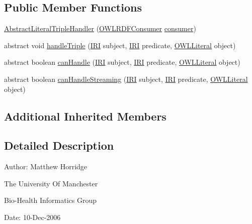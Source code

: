 \subsection*{Public Member Functions}
\begin{DoxyCompactItemize}
\item 
\hyperlink{classorg_1_1coode_1_1owlapi_1_1rdfxml_1_1parser_1_1_abstract_literal_triple_handler_a212f6f83746ed09ef51f1dbf462107b2}{Abstract\-Literal\-Triple\-Handler} (\hyperlink{classorg_1_1coode_1_1owlapi_1_1rdfxml_1_1parser_1_1_o_w_l_r_d_f_consumer}{O\-W\-L\-R\-D\-F\-Consumer} \hyperlink{classorg_1_1coode_1_1owlapi_1_1rdfxml_1_1parser_1_1_abstract_triple_handler_a4ccf4d898ff01eb1cadfa04b23d54e9c}{consumer})
\item 
abstract void \hyperlink{classorg_1_1coode_1_1owlapi_1_1rdfxml_1_1parser_1_1_abstract_literal_triple_handler_a67005240b8c67909e4a49c6ce0bad6b2}{handle\-Triple} (\hyperlink{classorg_1_1semanticweb_1_1owlapi_1_1model_1_1_i_r_i}{I\-R\-I} subject, \hyperlink{classorg_1_1semanticweb_1_1owlapi_1_1model_1_1_i_r_i}{I\-R\-I} predicate, \hyperlink{interfaceorg_1_1semanticweb_1_1owlapi_1_1model_1_1_o_w_l_literal}{O\-W\-L\-Literal} object)
\item 
abstract boolean \hyperlink{classorg_1_1coode_1_1owlapi_1_1rdfxml_1_1parser_1_1_abstract_literal_triple_handler_a86aad106f9096f130d64f23453743c2c}{can\-Handle} (\hyperlink{classorg_1_1semanticweb_1_1owlapi_1_1model_1_1_i_r_i}{I\-R\-I} subject, \hyperlink{classorg_1_1semanticweb_1_1owlapi_1_1model_1_1_i_r_i}{I\-R\-I} predicate, \hyperlink{interfaceorg_1_1semanticweb_1_1owlapi_1_1model_1_1_o_w_l_literal}{O\-W\-L\-Literal} object)
\item 
abstract boolean \hyperlink{classorg_1_1coode_1_1owlapi_1_1rdfxml_1_1parser_1_1_abstract_literal_triple_handler_ab94c7a734fbc3cf0589ddf206ab20265}{can\-Handle\-Streaming} (\hyperlink{classorg_1_1semanticweb_1_1owlapi_1_1model_1_1_i_r_i}{I\-R\-I} subject, \hyperlink{classorg_1_1semanticweb_1_1owlapi_1_1model_1_1_i_r_i}{I\-R\-I} predicate, \hyperlink{interfaceorg_1_1semanticweb_1_1owlapi_1_1model_1_1_o_w_l_literal}{O\-W\-L\-Literal} object)
\end{DoxyCompactItemize}
\subsection*{Additional Inherited Members}


\subsection{Detailed Description}
Author\-: Matthew Horridge\par
 The University Of Manchester\par
 Bio-\/\-Health Informatics Group\par
 Date\-: 10-\/\-Dec-\/2006\par
\par
 

